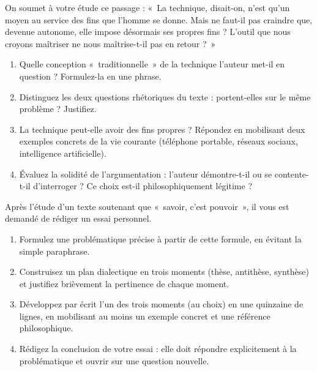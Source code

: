 \documentclass[11pt]{article}
\begin{document}
\begin{exercice}
On soumet à votre étude ce passage : «~La technique, disait-on, n'est qu'un moyen au service des fins que l'homme se donne. Mais ne faut-il pas craindre que, devenue autonome, elle impose désormais ses propres fins ? L'outil que nous croyons maîtriser ne nous maîtrise-t-il pas en retour ?~»
\begin{enumerate}
\item Quelle conception «~traditionnelle~» de la technique l'auteur met-il en question ? Formulez-la en une phrase.
\item Distinguez les deux questions rhétoriques du texte : portent-elles sur le même problème ? Justifiez.
\item La technique peut-elle avoir des fins propres ? Répondez en mobilisant deux exemples concrets de la vie courante (téléphone portable, réseaux sociaux, intelligence artificielle).
\item Évaluez la solidité de l'argumentation : l'auteur démontre-t-il ou se contente-t-il d'interroger ? Ce choix est-il philosophiquement légitime ?
\end{enumerate}
\end{exercice}

\begin{exercice}
Après l'étude d'un texte soutenant que «~savoir, c'est pouvoir~», il vous est demandé de rédiger un essai personnel.
\begin{enumerate}
\item Formulez une problématique précise à partir de cette formule, en évitant la simple paraphrase.
\item Construisez un plan dialectique en trois moments (thèse, antithèse, synthèse) et justifiez brièvement la pertinence de chaque moment.
\item Développez par écrit l'un des trois moments (au choix) en une quinzaine de lignes, en mobilisant au moins un exemple concret et une référence philosophique.
\item Rédigez la conclusion de votre essai : elle doit répondre explicitement à la problématique et ouvrir sur une question nouvelle.
\end{enumerate}
\end{exercice}
\end{document}

